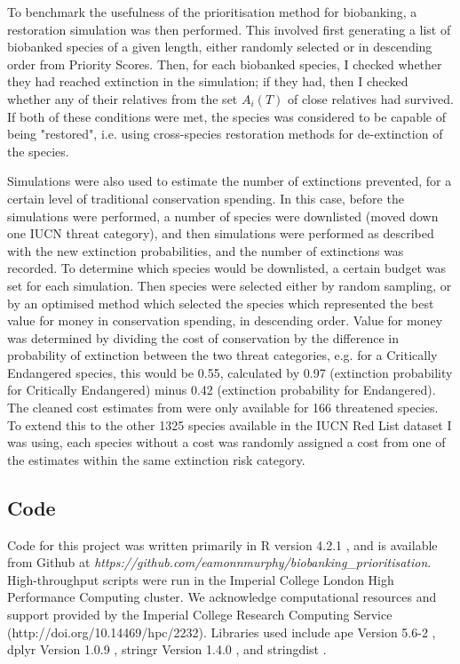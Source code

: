 \documentclass[12pt]{article}
\begin{document}
	To benchmark the usefulness of the prioritisation method for biobanking, a restoration simulation
	was then performed. This involved first generating a list of biobanked species of a given length,
	either randomly selected or in descending order from Priority Scores. Then, for each biobanked
	species, I checked whether they had reached extinction in the simulation; if they had, then I 
	checked whether any of their relatives from the set $A_i(T)$ of close relatives had survived.
	If both of these conditions were met, the species was considered to be capable of being "restored",
	i.e. using cross-species restoration methods for de-extinction of the species.
	
	Simulations were also used to estimate the number of extinctions prevented, for a certain level
	of traditional conservation spending. In this case, before the simulations were performed, a
	number of species were downlisted (moved down one IUCN threat category), and then simulations
	were performed as described with the new extinction probabilities, and the number of extinctions
	was recorded. To determine which species would be downlisted, a certain budget was set for each
	simulation. Then species were selected either by random sampling, or by an optimised method
	which selected the species which represented the best value for money in conservation spending,
	in descending order. Value for money was determined by dividing the cost of conservation
	by the difference in probability of extinction between the two threat categories, e.g. for
	a Critically Endangered species, this would be 0.55,
	calculated by 0.97 (extinction probability for Critically
	Endangered) minus 0.42 (extinction probability for Endangered). The cleaned cost estimates
	from \citep{mccarthyFinancialCostsMeeting2012} were only available for 166 threatened species.
	To extend this to the other 1325 species available in the IUCN Red List dataset I was 
	using, each species without a cost was randomly assigned a cost from one of the estimates within
	the same extinction risk category.
	
	\subsection{Code}
	Code for this project was written primarily in R version 4.2.1 \citep{rcite},
	and is available from Github at
	\textit{https://github.com/eamonnmurphy/biobanking\_prioritisation}.
	High-throughput scripts were
	run in the Imperial College London High Performance Computing cluster.
	We acknowledge computational resources and support provided by the
	Imperial College Research Computing Service (http://doi.org/10.14469/hpc/2232).
	Libraries used
	include ape Version 5.6-2 \citep{paradisApeEnvironmentModern2019},
	dplyr Version 1.0.9 \citep{dplyr},
	stringr Version 1.4.0 \citep{stringr}, and stringdist \citep{stringdist}.
	
\end{document}
